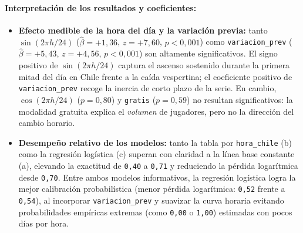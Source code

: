 \documentclass[11pt,a4paper]{article}
\begin{document}
\paragraph{Interpretación de los resultados y coeficientes:}
\begin{itemize}
    \item \textbf{Efecto medible de la hora del día y la variación previa:} tanto $\sin(2\pi h/24)$ ($\hat{\beta} = +1{,}36$, $z = +7{,}60$, $p < 0{,}001$) como \texttt{variacion\_prev} ($\hat{\beta} = +5{,}43$, $z = +4{,}56$, $p < 0{,}001$) son altamente significativos. El signo positivo de $\sin(2\pi h/24)$ captura el ascenso sostenido durante la primera mitad del día en Chile frente a la caída vespertina; el coeficiente positivo de \texttt{variacion\_prev} recoge la inercia de corto plazo de la serie. En cambio, $\cos(2\pi h/24)$ ($p = 0{,}80$) y \texttt{gratis} ($p = 0{,}59$) no resultan significativos: la modalidad gratuita explica el \emph{volumen} de jugadores, pero no la dirección del cambio horario.
    \item \textbf{Desempeño relativo de los modelos:} tanto la tabla por \texttt{hora\_chile} (b) como la regresión logística (c) superan con claridad a la línea base constante (a), elevando la exactitud de \texttt{0,40} a \texttt{0,71} y reduciendo la pérdida logarítmica desde \texttt{0,70}. Entre ambos modelos informativos, la regresión logística logra la mejor calibración probabilística (menor pérdida logarítmica: \texttt{0,52} frente a \texttt{0,54}), al incorporar \texttt{variacion\_prev} y suavizar la curva horaria evitando probabilidades empíricas extremas (como \texttt{0,00} o \texttt{1,00}) estimadas con pocos días por hora.
\end{itemize}
\end{document}
